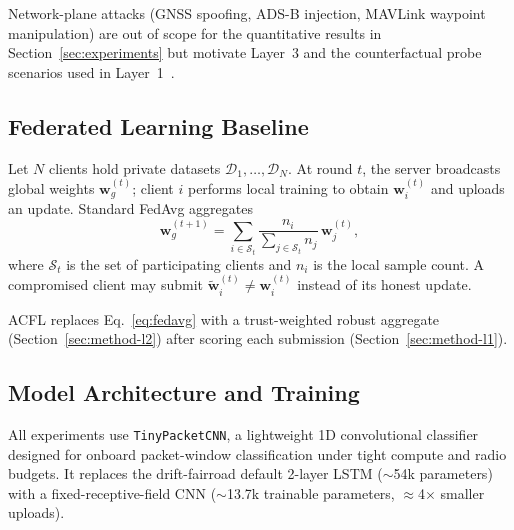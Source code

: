 Network-plane attacks (GNSS spoofing, ADS-B injection, MAVLink waypoint manipulation) are out of scope for the quantitative results in Section~\ref{sec:experiments} but motivate Layer~3 and the counterfactual probe scenarios used in Layer~1~\cite{humphreys2008spoofing,strohmeier2011adsb,yaacoub2020uav}.

\subsection{Federated Learning Baseline}
\label{sec:method-fl}

Let $N$ clients hold private datasets $\mathcal{D}_1,\ldots,\mathcal{D}_N$.
At round $t$, the server broadcasts global weights $\mathbf{w}_g^{(t)}$; client $i$ performs local training to obtain $\mathbf{w}_i^{(t)}$ and uploads an update.
Standard FedAvg aggregates
\begin{equation}
  \mathbf{w}_g^{(t+1)} = \sum_{i \in \mathcal{S}_t} \frac{n_i}{\sum_{j \in \mathcal{S}_t} n_j}\,\mathbf{w}_j^{(t)},
  \label{eq:fedavg}
\end{equation}
where $\mathcal{S}_t$ is the set of participating clients and $n_i$ is the local sample count.
A compromised client may submit $\tilde{\mathbf{w}}_i^{(t)} \neq \mathbf{w}_i^{(t)}$ instead of its honest update.

ACFL replaces Eq.~\eqref{eq:fedavg} with a trust-weighted robust aggregate (Section~\ref{sec:method-l2}) after scoring each submission (Section~\ref{sec:method-l1}).

\subsection{Model Architecture and Training}
\label{sec:method-model}

All experiments use \texttt{TinyPacketCNN}, a lightweight 1D convolutional classifier designed for onboard packet-window classification under tight compute and radio budgets.
It replaces the drift-fairroad default 2-layer LSTM ($\sim$54k parameters) with a fixed-receptive-field CNN ($\sim$13.7k trainable parameters, $\approx$4$\times$ smaller uploads).

